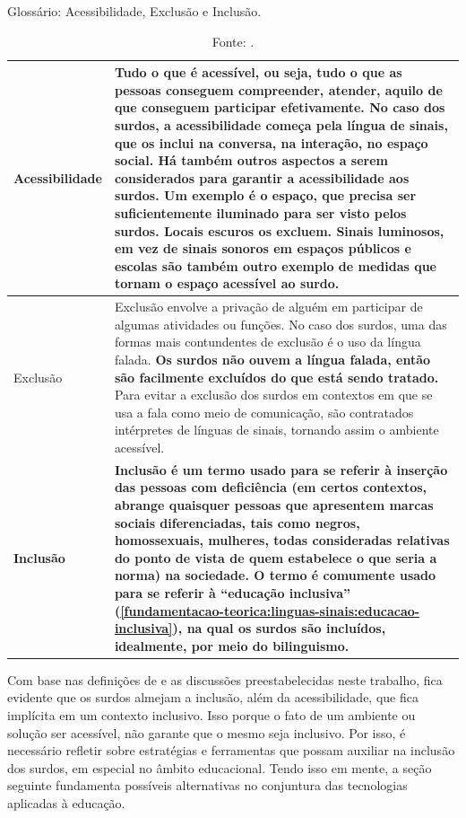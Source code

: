 \begin{table}[htbp]
\caption{Glossário: Acessibilidade, Exclusão e Inclusão.}
\label{tab:glossario:acessibilidade-exclusao-inclusao}
\begin{tabularx}{\textwidth}{l|X} \hline
Acessibilidade &  Tudo o que é acessível, ou seja, tudo o que as pessoas conseguem compreender, atender, aquilo de que conseguem participar efetivamente. \textbf{No caso dos surdos, a acessibilidade começa pela língua de sinais, que os inclui na conversa, na interação, no espaço social.} Há também outros aspectos a serem considerados para garantir a acessibilidade aos surdos. Um exemplo é o espaço, que precisa ser suficientemente iluminado para ser visto pelos surdos. Locais escuros os excluem. Sinais luminosos, em vez de sinais sonoros em espaços públicos e escolas são também outro exemplo de medidas que tornam o espaço acessível ao surdo.\\ \hline
Exclusão & Exclusão envolve a privação de alguém em participar de algumas atividades ou funções. No caso dos surdos, uma das formas mais contundentes de exclusão é o uso da língua falada. \textbf{Os surdos não ouvem a língua falada, então são facilmente excluídos do que está sendo tratado.} Para evitar a exclusão dos surdos em contextos em que se usa a fala como meio de comunicação, são contratados intérpretes de línguas de sinais, tornando assim o ambiente acessível. \\ \hline
\textbf{Inclusão} & \textbf{Inclusão é um termo usado para se referir à inserção das pessoas com deficiência (em certos contextos, abrange quaisquer pessoas que apresentem marcas sociais diferenciadas, tais como negros, homossexuais, mulheres, todas consideradas relativas do ponto de vista de quem estabelece o que seria a norma) na sociedade. O termo é comumente usado para se referir à ``educação inclusiva'' (\autoref{fundamentacao-teorica:linguas-sinais:educacao-inclusiva}), na qual os surdos são incluídos, idealmente, por meio do bilinguismo.} \\ \hline
\end{tabularx}
\caption*{Fonte: .}
\end{table}

Com base nas definições de  e as discussões preestabelecidas neste trabalho, fica evidente que os surdos almejam a inclusão, além da acessibilidade, que fica implícita em um contexto inclusivo. Isso porque o fato de um ambiente ou solução ser acessível, não garante que o mesmo seja inclusivo. Por isso, é necessário refletir sobre estratégias e ferramentas que possam auxiliar na inclusão dos surdos, em especial no âmbito educacional. Tendo isso em mente, a seção seguinte fundamenta possíveis alternativas no conjuntura das tecnologias aplicadas à educação.

